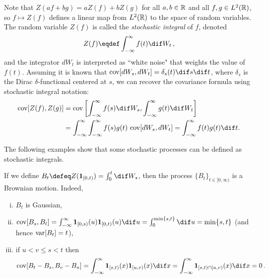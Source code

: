 \documentclass[../../../Master/AppliedStochastics.tex]{subfiles}
\begin{document}
Note that $Z(a f + b g) = a Z(f) + b Z(g)$
    for all $a, b\in\mathbb{R}$ and all $f, g\in L^2(\mathbb{R})$,
    so $f \mapsto Z(f)$ defines a linear map from $L^2(\mathbb{R})$
    to the space of random variables.
The random variable $Z(f)$ is called the \emph{stochastic integral} of $f$,
    denoted
\begin{equation*}
    Z(f) \eqdef \int_{-\infty}^\infty f(t) \dif W_t\,,
\end{equation*}
    and the integrator $d W_t$ is interpreted as ``white noise"
        that weights the value of $f(t)$.
Assuming it is known that $\cov[dW_s, dW_t] = \delta_s(t) \dif s \dif t$,
    where $\delta_s$ is the Dirac $\delta$-functional centered at $s$,
    we can recover the covariance formula using stochastic integral notation:
\begin{equation*}
\begin{aligned}
    \cov[Z(f),Z(g)] &= \cov\left[
        \int_{-\infty}^\infty f(s) \dif W_s,
        \int_{-\infty}^\infty g(t) \dif W_t\right]\\
                    &=\int_{-\infty}^\infty \int_{-\infty}^\infty
                        f(s) g(t) \, \cov[d W_s, d W_t]
                     =\int_{-\infty}^\infty f(t)g(t) \dif t.
\end{aligned}
\end{equation*}


The following examples show that some stochastic processes
    can be defined as stochastic integrals.
\begin{example}
    If we define $B_t \defeq Z(\mathbf{1}_{[0, t)}) = \int_0^t \dif W_s$,
    then the process $\{B_t\}_{t\in[0,\infty)}$ is a Brownian motion.
Indeed,
\begin{enumerate}[(i)]
    \item
    $B_t$ is Gaussian,
    
    \item
    $\cov[B_s,B_t] = \int_{- \infty}^\infty
        \mathbf{1}_{[0,s)}(u) \mathbf{1}_{[0,t)}(u) \dif u 
                   = \int_0^{\min\{s, t\}} \dif u
                   = \min\{s, t\}$ (and hence $\operatorname{var}[B_t] = t$),
    
    \item 
    if $u < v \leq s < t$ then
    \begin{equation*}
        \cov[B_t - B_s, B_v - B_u] = \int_{-\infty}^\infty
            \mathbf{1}_{[s,t)}(x) \mathbf{1}_{[u,v)}(x) \dif x
            =\int_{-\infty}^\infty \mathbf{1}_{[s,t) \cap [u,v)}(x) \dif x
            = 0\,.
    \end{equation*}
\end{enumerate}
\end{example}
\end{document}
